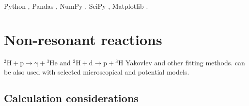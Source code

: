 \documentclass[openany]{book}
\begin{document}
Python \cite{rossum_drake_2009}, Pandas \cite{mckinney_2010}, NumPy \cite{harris_millman_vanderwalt_gommers_virtanen_cournapeau_wieser_taylor_berg_smith_et_2020}, SciPy \cite{virtanen_gommers_oliphant_haberland_reddy_cournapeau_burovski_peterson_weckesser_bright_et_2020}, Matplotlib \cite{hunter_2007}.


\section{Non-resonant reactions} \label{sec:nonResonant}


$\mathrm{{}^{2}{H} + p \rightarrow \gamma +  {}^{3}{He} } $ and $\mathrm{{}^{2}{H} + d  \rightarrow p+  {}^{3}{H}} $
Yakovlev and other fitting methods.  can be also used with selected microscopical and potential models. \\




 
 
 
\subsection{Calculation considerations}
\end{document}
